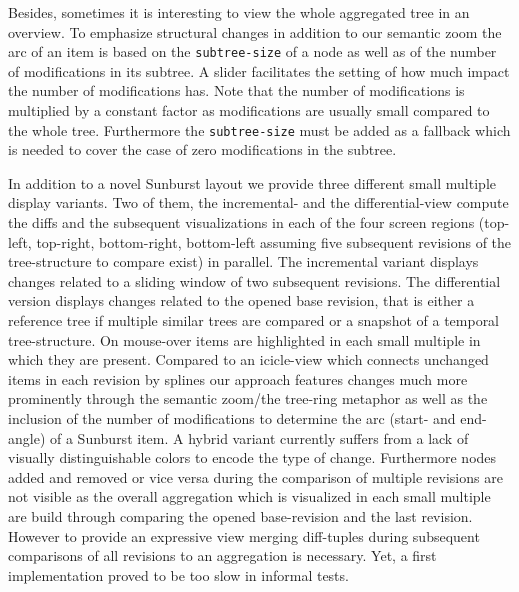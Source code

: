 Besides, sometimes it is interesting to view the whole aggregated tree in an overview. To emphasize structural changes in addition to our semantic zoom the arc of an item is based on the \texttt{subtree-size} of a node as well as of the number of modifications in its subtree. A slider facilitates the setting of how much impact the number of modifications has. Note that the number of modifications is multiplied by a constant factor as modifications are usually small compared to the whole tree. Furthermore the \texttt{subtree-size} must be added as a fallback which is needed to cover the case of zero modifications in the subtree.

In addition to a novel Sunburst layout we provide three different small multiple display variants. Two of them, the incremental- and the differential-view compute the diffs and the subsequent visualizations in each of the four screen regions (top-left, top-right, bottom-right, bottom-left assuming five subsequent revisions of the tree-structure to compare exist) in parallel. The incremental variant displays changes related to a sliding window of two subsequent revisions. The differential version displays changes related to the opened base revision, that is either a reference tree if multiple similar trees are compared or a snapshot of a temporal tree-structure. On mouse-over items are highlighted in each small multiple in which they are present. Compared to an icicle-view which connects unchanged items in each revision by splines our approach features changes much more prominently through the semantic zoom/the tree-ring metaphor as well as the inclusion of the number of modifications to determine the arc (start- and end-angle) of a Sunburst item. A hybrid variant currently suffers from a lack of visually distinguishable colors to encode the type of change. Furthermore nodes added and removed or vice versa during the comparison of multiple revisions are not visible as the overall aggregation which is visualized in each small multiple are build through comparing the opened base-revision and the last revision. However to provide an expressive view merging diff-tuples during subsequent comparisons of all revisions to an aggregation is necessary. Yet, a first implementation proved to be too slow in informal tests.

